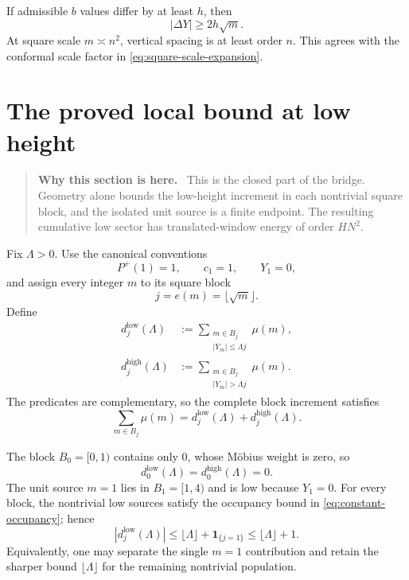 \documentclass[11pt]{article}
\theoremstyle{definition}
\theoremstyle{remark}
\newcommand{\Pplus}{P^{+}}
\newcommand{\1}{\mathbf{1}}
\newenvironment{motivation}
  {\begin{quote}\small\color{ovvogray}\textbf{Why this section is here.}\ }
  {\end{quote}}
\begin{document}
If admissible $b$ values differ by at least $h$, then
\begin{equation}
 |\Delta Y|\ge2h\sqrt m.
 \label{eq:Y-spacing}
\end{equation}
At square scale $m\asymp n^2$, vertical spacing is at least order $n$.  This agrees with the conformal scale factor in \cref{eq:square-scale-expansion}.

\section{The proved local bound at low height}
\label{sec:low-cubic}

\begin{motivation}
This is the closed part of the bridge.  Geometry alone bounds the low-height increment in each nontrivial square block, and the isolated unit source is a finite endpoint.  The resulting cumulative low sector has translated-window energy of order $HN^2$.
\end{motivation}

Fix $\Lambda>0$.  Use the canonical conventions
\[
 \Pplus(1)=1,\qquad c_1=1,\qquad Y_1=0,
\]
and assign every integer $m$ to its square block
\begin{equation}
 j=e(m)=\lfloor\sqrt m\rfloor.
 \label{eq:entry-block}
\end{equation}
Define
\begin{align}
 d_j^{\mathrm{low}}(\Lambda)
 &:={}
 \sum_{\substack{m\in B_j\\|Y_m|\le\Lambda j}}\mu(m),
 \label{eq:low-block-increment}\\
 d_j^{\mathrm{high}}(\Lambda)
 &:={}
 \sum_{\substack{m\in B_j\\|Y_m|>\Lambda j}}\mu(m).
 \label{eq:high-block-increment}
\end{align}
The predicates are complementary, so the complete block increment satisfies
\begin{equation}
 \sum_{m\in B_j}\mu(m)
 =d_j^{\mathrm{low}}(\Lambda)+d_j^{\mathrm{high}}(\Lambda).
 \label{eq:block-low-high-recombination}
\end{equation}

The block $B_0=[0,1)$ contains only $0$, whose M\"obius weight is zero, so
\begin{equation}
 d_0^{\mathrm{low}}(\Lambda)=d_0^{\mathrm{high}}(\Lambda)=0.
 \label{eq:zero-block-endpoint}
\end{equation}
The unit source $m=1$ lies in $B_1=[1,4)$ and is low because $Y_1=0$.  For every block, the nontrivial low sources satisfy the occupancy bound in \cref{eq:constant-occupancy}; hence
\begin{equation}
 \boxed{
 |d_j^{\mathrm{low}}(\Lambda)|
 \le \lfloor\Lambda\rfloor+\1_{\{j=1\}}
 \le \lfloor\Lambda\rfloor+1.
 }
 \label{eq:low-block-bound}
\end{equation}
Equivalently, one may separate the single $m=1$ contribution and retain the sharper bound $\lfloor\Lambda\rfloor$ for the remaining nontrivial population.
\end{document}

